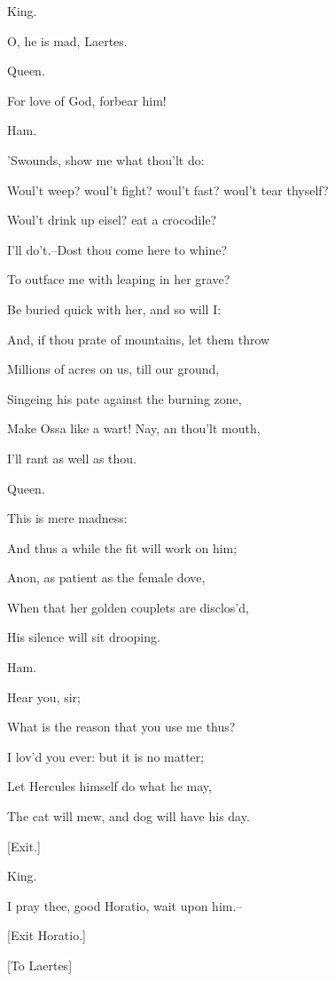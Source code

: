 \documentclass[12pt]{book}
\begin{document}
King.

O, he is mad, Laertes.



Queen.

For love of God, forbear him!



Ham.

'Swounds, show me what thou'lt do:

Woul't weep? woul't fight? woul't fast? woul't tear thyself?

Woul't drink up eisel? eat a crocodile?

I'll do't.--Dost thou come here to whine?

To outface me with leaping in her grave?

Be buried quick with her, and so will I:

And, if thou prate of mountains, let them throw

Millions of acres on us, till our ground,

Singeing his pate against the burning zone,

Make Ossa like a wart! Nay, an thou'lt mouth,

I'll rant as well as thou.



Queen.

This is mere madness:

And thus a while the fit will work on him;

Anon, as patient as the female dove,

When that her golden couplets are disclos'd,

His silence will sit drooping.



Ham.

Hear you, sir;

What is the reason that you use me thus?

I lov'd you ever: but it is no matter;

Let Hercules himself do what he may,

The cat will mew, and dog will have his day.



[Exit.]



King.

I pray thee, good Horatio, wait upon him.--



[Exit Horatio.]

[To Laertes]
\end{document}
